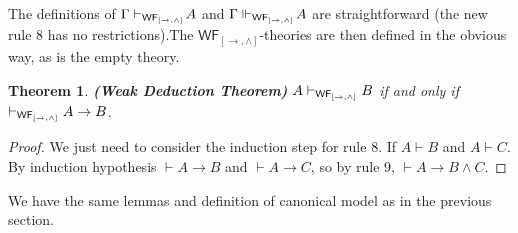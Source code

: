 \documentclass[12pt]{article}
\newtheorem{thm}{Theorem}[section]
\newtheorem{dfn}[thm]{Definition}
\begin{document}
\noindent The definitions of $\Gamma\vdash_{{\sf WF_{[\rightarrow, \wedge]}} }\!A$ and $\Gamma\Vdash_{{\sf WF_{[\rightarrow, \wedge]}} }\! A$ are straightforward (the new rule 8 has no restrictions).The $\mathsf{WF_{[ \rightarrow, \wedge ]}}$-theories are then defined in the obvious way, as is the empty theory.



\begin{thm}
\textbf{(Weak Deduction Theorem)} $A\vdash_{{\sf WF_{[\rightarrow, \wedge]}} } B  $ if and only if $ \vdash_{{\sf WF_{[\rightarrow, \wedge]}} } A\rightarrow B $.
\end{thm}
\begin{proof} We just need to consider the induction step for rule 8.  
If $ A\vdash B   $ and  $A\vdash C $. By induction hypothesis $ \vdash A\rightarrow B $ and $ \vdash A\rightarrow C $, so by rule 9, $ \vdash A\rightarrow B\wedge C  $.
\end{proof}

We have the same lemmas and definition of canonical model as in the previous section.

\end{document}

